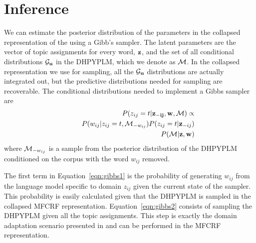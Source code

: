 \section{Inference}

We can estimate the posterior distribution of the parameters in the collapsed representation of  the \ourmodel using a Gibb's sampler.  The latent parameters are the vector of topic assignments for every word, ${\bf z}$,  and the set of all conditional distributions $\G_\bu$ in the DHPYPLM, which we denote as $\M$.  In the collapsed representation we use for sampling, all the $\G_{\bu}$ distributions are actually integrated out, but the predictive distributions needed for sampling are recoverable. The conditional distributions needed to implement a Gibbs sampler are
%
\begin{eqnarray}
& &P(z_{ij} = t | \mathbf{z_{-ij}},\mathbf{w}, \M) \propto  \label{eqn:gibbs1}\\
& &	\hspace{.5cm} P(w_{ij}|z_{ij}=t, \M_{-w_{ij}})P(z_{ij} = t | \mathbf{z}_{-ij}) \nonumber \\
& &P(\M |  {\bf z} , {\bf w}) \label{eqn:gibbs2} 
\end{eqnarray}
%
\noindent where $\M_{-w_{ij}}$ is a sample from the posterior distribution of the DHPYPLM conditioned on the corpus with the word $w_{ij}$ removed. 

The first term in Equation~\ref{eqn:gibbs1} is the probability of generating $w_{ij}$ from the language model specific to domain $z_{ij}$ given the current state of the sampler.  This probability is easily calculated given that the DHPYPLM is sampled in the collapsed MFCRF representation. Equation~\ref{eqn:gibbs2} consists of sampling the DHPYPLM given all the topic assignments.  This step is exactly the domain adaptation scenario presented in \cite{Wood2009a} and can be performed in the MFCRF representation.

